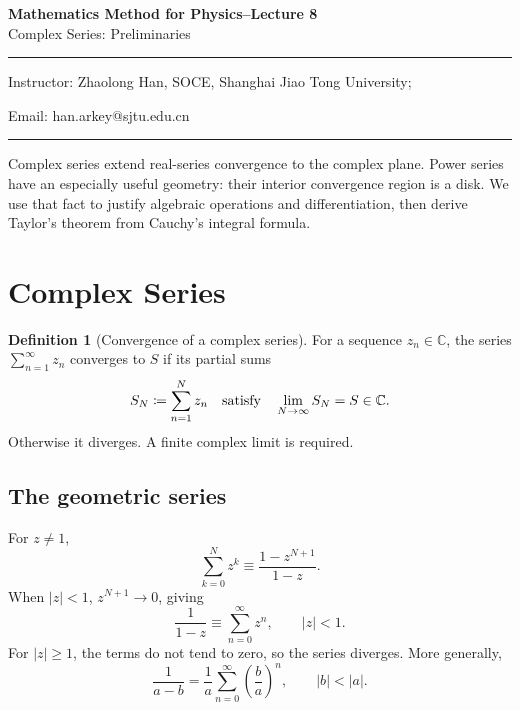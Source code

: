 \documentclass[11pt,a4paper]{article}
\theoremstyle{definition}
\newtheorem{definition}{Definition}
\theoremstyle{plain}
\newcommand{\C}{\mathbb{C}}
\begin{document}
\begin{center}
    {\LARGE \textbf{Mathematics Method for Physics--Lecture 8}} \\[0.6em]
    {\large Complex Series: Preliminaries}
\end{center}

\vspace{-0.5em}
\noindent\rule{\textwidth}{0.5pt}
\vspace{0.3em}

\begin{center}
    Instructor: Zhaolong Han, SOCE, Shanghai Jiao Tong University;
\end{center}

\vspace{-0.6em}
\noindent Email: han.arkey@sjtu.edu.cn

\vspace{0.4em}
\noindent\rule{\textwidth}{0.5pt}

\vspace{0.8em}

Complex series extend real-series convergence to the complex plane.
Power series have an especially useful geometry: their interior
convergence region is a disk. We use that fact to justify algebraic
operations and differentiation, then derive Taylor's theorem from
Cauchy's integral formula.

\section{Complex Series}
\begin{definition}[Convergence of a complex series]
For a sequence $z_n\in\C$, the series $\sum_{n=1}^{\infty}z_n$ converges
to $S$ if its partial sums
\begin{equation}\label{eq:01}
S_N\coloneqq \sum_{n=1}^{N}z_n
 \quad\hbox{satisfy}\quad \lim_{N\to\infty}S_N=S\in\C.
\end{equation}
Otherwise it diverges. A finite complex limit is required.
\end{definition}


\subsection{The geometric series}
For $z\neq1$,
\begin{equation}\label{eq:02}
\sum_{k=0}^{N}z^k\equiv \frac{1-z^{N+1}}{1-z}.
\end{equation}
When $|z|<1$, $z^{N+1}\to0$, giving
\begin{equation}\label{eq:03}
\boxed{\frac1{1-z}\equiv \sum_{n=0}^{\infty}z^n,\qquad |z|<1.}
\end{equation}
For $|z|\geq1$, the terms do not tend to zero, so the series diverges.
More generally,
\begin{equation}\label{eq:04}
\frac1{a-b}=\frac1a\sum_{n=0}^{\infty}\left(\frac ba\right)^n,
 \qquad |b|<|a|.
\end{equation}
\end{document}
